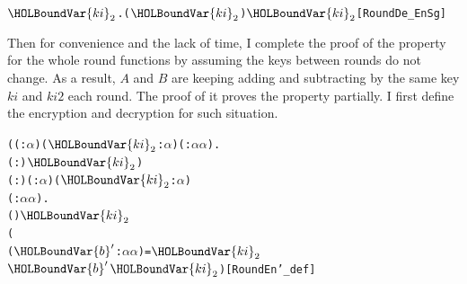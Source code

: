 \documentclass{article}
\begin{document}
\begin{alltt}
\HOLTokenTurnstile{} \HOLSymConst{\HOLTokenForall{}}  \ensuremath{\HOLBoundVar{ki}\sb{\mathrm{2}}}.  (   \ensuremath{\HOLBoundVar{ki}\sb{\mathrm{2}}})  \ensuremath{\HOLBoundVar{ki}\sb{\mathrm{2}}} \HOLSymConst{=} \hfill{[RoundDe_EnSg]}
\end{alltt}

Then for convenience and the lack of time, I complete the proof of the property for the whole round functions by assuming the
keys between rounds do not change. As a result, $A$ and $B$ are keeping adding and subtracting by the same key $ki$ and $ki2$
each round. The proof of it proves the property partially. I first define the encryption and decryption for such situation.

\begin{alltt}
\HOLTokenTurnstile{} (\HOLSymConst{\HOLTokenForall{}}( :\ensuremath{\alpha} ) (\ensuremath{\HOLBoundVar{ki}\sb{\mathrm{2}}} :\ensuremath{\alpha} ) ( :\ensuremath{\alpha}  \HOLTokenProd{} \ensuremath{\alpha} ).
       ( :)  \ensuremath{\HOLBoundVar{ki}\sb{\mathrm{2}}}  \HOLSymConst{=} ) \HOLSymConst{\HOLTokenConj{}}
   \HOLSymConst{\HOLTokenForall{}}( :) ( :\ensuremath{\alpha} ) (\ensuremath{\HOLBoundVar{ki}\sb{\mathrm{2}}} :\ensuremath{\alpha} )
       ( :\ensuremath{\alpha}  \HOLTokenProd{} \ensuremath{\alpha} ).
      ( )  \ensuremath{\HOLBoundVar{ki}\sb{\mathrm{2}}}  \HOLSymConst{=}
     (
        (\ensuremath{\HOLBoundVar{b}\sp{\prime{}}} :\ensuremath{\alpha}  \HOLTokenProd{} \ensuremath{\alpha} ) =    \ensuremath{\HOLBoundVar{ki}\sb{\mathrm{2}}} 
         \ensuremath{\HOLBoundVar{b}\sp{\prime{}}}  \ensuremath{\HOLBoundVar{ki}\sb{\mathrm{2}}})\hfill{[RoundEn'_def]}
\end{alltt}
\end{document}
